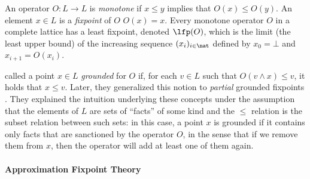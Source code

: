 An operator $O:L\to L$ is \emph{monotone} if $x\leq y$ implies that $O(x)\leq O(y)$.
An element $x\in L$ is 
a \emph{fixpoint}
of $O$ 
$O(x)=x$.
Every monotone operator $O$ in a %
complete lattice has a least fixpoint, denoted $\lfp(O)$, which is 
the limit (the least upper bound) of the increasing sequence $(x_i)_{i \in \nat}$ defined by $x_0=\bot$ and $x_{i+1} = O(x_i)$. 


 called a point  $x\in L$ \emph{grounded} for $O$ if, for each $v\in L$ such that $O(v\land x)\leq v$, it holds that $x\leq v$. Later, they generalized this notion to \emph{partial} grounded fixpoints . 
They explained the intuition underlying these concepts under the assumption that the elements of $L$ are sets of ``facts'' of some kind and the $\leq$ relation is the subset relation between such sets:
in this case, a point $x$ is grounded if it contains only facts that are sanctioned by the operator $O$, 
in the sense that if we remove them from $x$, then the operator will add at least one of them again. 



\paragraph{Approximation Fixpoint Theory}


